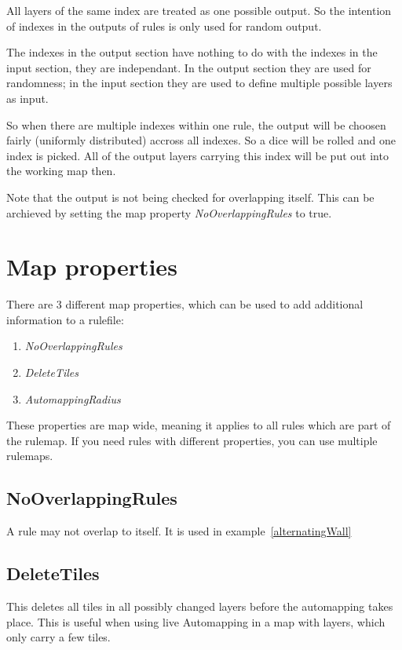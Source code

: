 \documentclass[dvips, a4paper, 12pt,listof=totoc, oneside, parskip]{scrbook}
\begin{document}
All layers of the same index are treated as one possible output.
So the intention of indexes in the outputs of rules is only used for random
output.

The indexes in the output section have nothing to do with the indexes in the input section,
they are independant. In the output section they are used for randomness; in the input section
they are used to define multiple possible layers as input.

So when there are multiple indexes within one rule, the output will be choosen
fairly (uniformly distributed) accross all indexes. So a dice will be rolled and one index is picked.
All of the output layers carrying this index will be put out into the working map then.

Note that the output is not being checked for overlapping itself. This can be archieved by
setting the map property \emph{NoOverlappingRules} to true.




\section{Map properties}

There are 3 different map properties, which can be used to add additional
information to a rulefile:
\begin{enumerate}
  \item \emph{NoOverlappingRules}
  \item \emph{DeleteTiles}
  \item \emph{AutomappingRadius}
\end{enumerate}
These properties are map wide, meaning it applies to all rules which are part of the rulemap.
If you need rules with different properties, you can use multiple rulemaps.


\subsection{NoOverlappingRules}
A rule may not overlap to itself. It is used in example~\ref{alternatingWall}

\subsection{DeleteTiles}
This deletes all tiles in all possibly changed layers before the automapping takes place.
This is useful when using live Automapping in a map with layers, which only carry
a few tiles.
\end{document}

